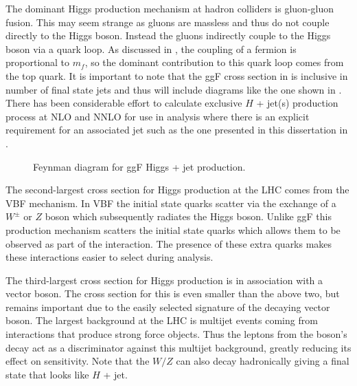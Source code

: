 The dominant Higgs production mechanism at hadron colliders is gluon-gluon
fusion.  This may seem strange as gluons are massless and thus do not couple
directly to the Higgs boson.  Instead the gluons indirectly couple to the Higgs
boson via a quark loop.  As discussed in , the
coupling of a fermion is proportional to $m_f$, so the dominant contribution to
this quark loop comes from the top quark. It is important to note that the ggF
cross section in  is inclusive in number
of final state jets and thus will include diagrams like the one shown in
.  There has been considerable effort to calculate exclusive
$H$ + jet(s) production process at NLO and NNLO \cite{deFlorian:2016spz} for
use in analysis where there is an explicit requirement for an associated jet
such as the one presented in this dissertation in .

\begin{figure}[!htbp]
\centering
{}
\caption{Feynman diagram for ggF Higgs + jet production.}
\label{fig:h_plus_j}
\end{figure}

The second-largest cross section for Higgs production at the LHC comes from the VBF
mechanism.  In VBF the initial state quarks scatter via the exchange of a
$W^{\pm}$ or $Z$ boson which subsequently radiates the Higgs boson.  Unlike ggF
this production mechanism scatters the initial state quarks which allows them to
be observed as part of the interaction.  The presence of these extra quarks
makes these interactions easier to select during analysis.

The third-largest cross section for Higgs production is in association with a
vector boson. The cross section for this is even smaller than the above two, but
remains important due to the easily selected signature of the decaying vector
boson.  The largest background at the LHC is multijet events coming from
interactions that produce strong force objects.  Thus the leptons from the
boson's decay act as a discriminator against this multijet background, greatly
reducing its effect on sensitivity. Note that the $W/Z$ can also decay
hadronically giving a final state that looks like $H$ + jet.

